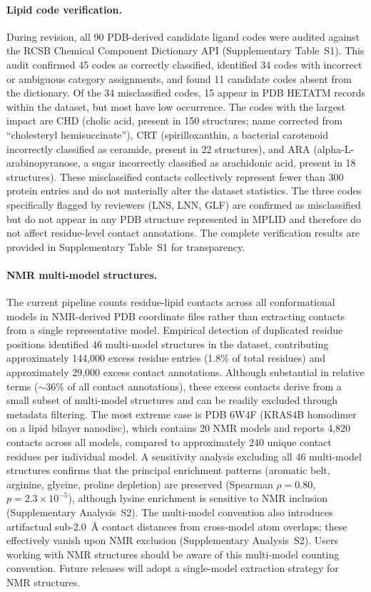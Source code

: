 \documentclass[unnumsec,webpdf,contemporary,large]{oup-authoring-template}
\begin{document}
\paragraph{Lipid code verification.} During revision, all 90 PDB-derived candidate ligand codes were audited against the RCSB Chemical Component Dictionary API (Supplementary Table~S1). This audit confirmed 45 codes as correctly classified, identified 34 codes with incorrect or ambiguous category assignments, and found 11 candidate codes absent from the dictionary. Of the 34 misclassified codes, 15 appear in PDB HETATM records within the dataset, but most have low occurrence. The codes with the largest impact are CHD (cholic acid, present in 150 structures; name corrected from ``cholesteryl hemisuccinate''), CRT (spirilloxanthin, a bacterial carotenoid incorrectly classified as ceramide, present in 22 structures), and ARA (alpha-L-arabinopyranose, a sugar incorrectly classified as arachidonic acid, present in 18 structures). These misclassified contacts collectively represent fewer than 300 protein entries and do not materially alter the dataset statistics. The three codes specifically flagged by reviewers (LNS, LNN, GLF) are confirmed as misclassified but do not appear in any PDB structure represented in MPLID and therefore do not affect residue-level contact annotations. The complete verification results are provided in Supplementary Table~S1 for transparency.

\paragraph{NMR multi-model structures.} The current pipeline counts residue-lipid contacts across all conformational models in NMR-derived PDB coordinate files rather than extracting contacts from a single representative model. Empirical detection of duplicated residue positions identified 46 multi-model structures in the dataset, contributing approximately 144,000 excess residue entries (1.8\% of total residues) and approximately 29,000 excess contact annotations. Although substantial in relative terms ($\sim$36\% of all contact annotations), these excess contacts derive from a small subset of multi-model structures and can be readily excluded through metadata filtering. The most extreme case is PDB 6W4F (KRAS4B homodimer on a lipid bilayer nanodisc), which contains 20 NMR models and reports 4,820 contacts across all models, compared to approximately 240 unique contact residues per individual model. A sensitivity analysis excluding all 46 multi-model structures confirms that the principal enrichment patterns (aromatic belt, arginine, glycine, proline depletion) are preserved (Spearman $\rho = 0.80$, $p = 2.3 \times 10^{-5}$), although lysine enrichment is sensitive to NMR inclusion (Supplementary Analysis~S2). The multi-model convention also introduces artifactual sub-2.0~\AA{} contact distances from cross-model atom overlaps; these effectively vanish upon NMR exclusion (Supplementary Analysis~S2). Users working with NMR structures should be aware of this multi-model counting convention. Future releases will adopt a single-model extraction strategy for NMR structures.
\end{document}
